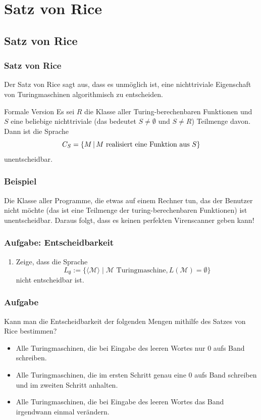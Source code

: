 \section{Satz von Rice}
\subsection{Satz von Rice}
\begin{frame}
\frametitle{Satz von Rice}
Der Satz von Rice sagt aus, dass es unmöglich ist, eine nichttriviale Eigenschaft von Turingmaschinen algorithmisch zu entscheiden.
\begin{block}{Formale Version}
Es sei $R$ die Klasse aller Turing-berechenbaren Funktionen und $S$ eine beliebige nichttriviale (das bedeutet $S \neq \emptyset$ und $S \neq R$) Teilmenge davon. Dann ist die Sprache
$$ C_S = \left\lbrace M \,\middle\vert\, M \text{ realisiert eine Funktion aus } S \right\rbrace $$
unentscheidbar. 
\end{block}
\end{frame}
\begin{frame}
\frametitle{Beispiel}
Die Klasse aller Programme, die etwas auf einem Rechner tun, das der Benutzer nicht möchte (das ist eine Teilmenge der turing-berechenbaren Funktionen) ist unentscheidbar. Daraus folgt, dass es keinen perfekten Virenscanner geben kann!
\end{frame}

\begin{frame}
\frametitle{Aufgabe: Entscheidbarkeit}
\begin{enumerate}
\item Zeige, dass die Sprache $$L_{\emptyset} := \{\langle \mathcal M \rangle \mid \mathcal M \text{ Turingmaschine}, L(\mathcal M) = \emptyset\}$$ nicht entscheidbar ist.
\end{enumerate}
\end{frame}

\begin{frame}
\frametitle{Aufgabe}
Kann man die Entscheidbarkeit der folgenden Mengen mithilfe des Satzes von Rice bestimmen?
\begin{itemize}
\item Alle Turingmaschinen, die bei Eingabe des leeren Wortes nur $0$ aufs Band schreiben.
\item Alle Turingmaschinen, die im ersten Schritt genau eine $0$ aufs Band schreiben und im zweiten Schritt anhalten. 
\item Alle Turingmaschinen, die bei Eingabe des leeren Wortes das Band irgendwann einmal verändern.
\end{itemize}
\end{frame}

